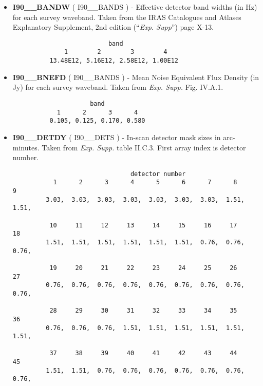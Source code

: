 \begin{itemize}
\item {\bf I90\_\_BANDW} ( I90\_\_BANDS ) -  Effective detector band widths (in Hz) for
each survey waveband. Taken from the IRAS Catalogues and Atlases Explanatory
Supplement, 2nd edition (``{\em Exp. Supp}'') page X-13. 

\begin{minipage}[t]{\textwidth}
\small
\begin{verbatim}
                          band
              1        2        3        4   
          13.48E12, 5.16E12, 2.58E12, 1.00E12 
\end{verbatim}
\normalsize
\end{minipage}

\item {\bf I90\_\_BNEFD} ( I90\_\_BANDS ) -  Mean Noise Equivalent Flux Density (in Jy) 
for each survey waveband. Taken from {\em Exp. Supp.} Fig. IV.A.1.

\begin{minipage}[t]{\textwidth}
\small
\begin{verbatim}
                     band
            1      2      3      4   
          0.105, 0.125, 0.170, 0.580
\end{verbatim}
\normalsize
\end{minipage}

\item {\bf I90\_\_DETDY} ( I90\_\_DETS ) -   In-scan detector mask sizes in arc-minutes. 
Taken from {\em Exp. Supp.} table II.C.3. First array index is detector number.

\begin{minipage}[t]{\textwidth}
\small
\begin{verbatim}
                                detector number
           1      2      3      4      5      6      7      8      9
         3.03,  3.03,  3.03,  3.03,  3.03,  3.03,  3.03,  1.51,  1.51,  

          10     11     12     13     14     15     16     17     18
         1.51,  1.51,  1.51,  1.51,  1.51,  1.51,  0.76,  0.76,  0.76,  

          19     20     21     22     23     24     25     26     27
         0.76,  0.76,  0.76,  0.76,  0.76,  0.76,  0.76,  0.76,  0.76,  

          28     29     30     31     32     33     34     35     36
         0.76,  0.76,  0.76,  1.51,  1.51,  1.51,  1.51,  1.51,  1.51,  

          37     38     39     40     41     42     43     44     45
         1.51,  1.51,  0.76,  0.76,  0.76,  0.76,  0.76,  0.76,  0.76,  


\end{verbatim}
\end{minipage}
\end{itemize}
